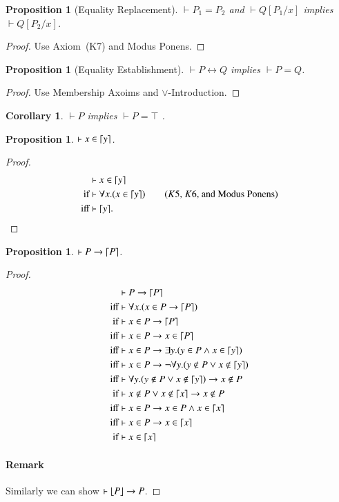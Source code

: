 \documentclass{article}
\theoremstyle{plain}
\newtheorem{prop}[thm]{Proposition}
\newtheorem{cor}[thm]{Corollary}
\DeclarePairedDelimiter\ceil{\lceil}{\rceil}
\DeclarePairedDelimiter\floor{\lfloor}{\rfloor}
\begin{document}
\begin{prop}[Equality Replacement]
\label{prop:ereplacement}
$\vdash P_1 = P_2$ and $\vdash Q[P_1 / x]$ implies $\vdash Q[P_2 / x]$.
\end{prop}
\begin{proof}
	Use Axiom~(K7) and Modus Ponens.
\end{proof}

\begin{prop}[Equality Establishment]
\label{prop:eestablish}
$\vdash P \leftrightarrow Q$ implies $\vdash P = Q$.
\end{prop}
\begin{proof}
	Use Membership Axoims and $\vee$-Introduction.
\end{proof}
\begin{cor} \label{cor:top}
$\vdash P$ implies $\vdash P = \top$ .
\end{cor}

\begin{prop} \label{prop:var1}
$\vdash x \in \ceil*{y}$.
\end{prop}
\begin{proof}
\begin{align*}
&\vdash x \in \ceil*{y} \\
{\text{if}}& \vdash \forall x . (x \in \ceil*{y}) \tag{$K5$, $K6$, and Modus Ponens} \\
{\text{iff}}& \vdash \ceil*{y}.
\end{align*}
\end{proof}

\begin{prop} \label{prop:p->ceilp}
$\vdash P \to \ceil*{P}$.
\end{prop}
\begin{proof}
\begin{align*} 
&\vdash P \to \ceil*{P} \\
{\text{iff}}& \vdash \forall x . (x \in P \to \ceil*{P}) \\
{\text{if}}&  \vdash x \in P \to \ceil*{P} \\
{\text{iff}}& \vdash x \in P \to x \in \ceil*{P} \\
{\text{iff}}& \vdash x \in P \to \exists y . (y \in P \wedge x \in \ceil*{y}) \\
{\text{iff}}& \vdash x \in P \to \neg \forall y . (y \not \in P \vee x \not \in \ceil*{y}) \\
{\text{iff}}& \vdash \forall y . (y \not \in P \vee x \not \in \ceil*{y}) \to x \not \in P \\
{\text{if}}&  \vdash x \not \in P \vee x \not \in \ceil*{x} \to x \not \in P \\
{\text{iff}}& \vdash x \in P \to x \in P \wedge x \in \ceil*{x} \\
{\text{iff}}& \vdash x \in P \to x \in \ceil*{x} \\
{\text{if}}&  \vdash x \in \ceil*{x} \\
\end{align*}
\paragraph{Remark} Similarly we can show $\vdash \floor*{P} \to P$.
\end{proof}
\end{document}

